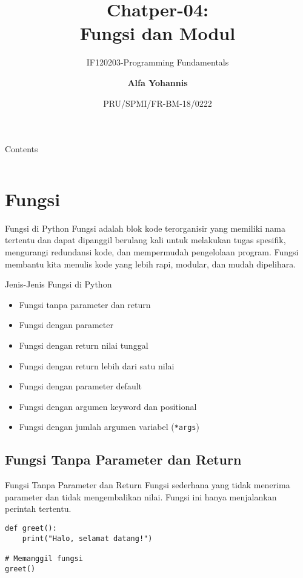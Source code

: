 \documentclass[aspectratio=169, table]{beamer}
\subtitle{IF120203-Programming Fundamentals}
\title{Chatper-04:\\\LARGE{Fungsi dan Modul\\}
\vspace{10pt}}
\date[Serial]{\scriptsize {PRU/SPMI/FR-BM-18/0222}}
\author[Pradita]{\small{\textbf{Alfa Yohannis}}}
\begin{document}
\frame{\titlepage}

\begin{frame}[fragile]{Contents}
\vspace{15pt}
\begin{columns}[t]
\begin{column}{.5\textwidth}
\tableofcontents[sections={1}]
\end{column}
\begin{column}{.5\textwidth}
\tableofcontents[sections={2-3}]
\end{column}
\end{columns}
\end{frame}

\section{Fungsi}

\begin{frame}{Fungsi di Python}
Fungsi adalah blok kode terorganisir yang memiliki nama tertentu dan dapat dipanggil berulang kali untuk melakukan tugas spesifik, mengurangi redundansi kode, dan mempermudah pengelolaan program. Fungsi membantu kita menulis kode yang lebih rapi, modular, dan mudah dipelihara.
\end{frame}

\begin{frame}{Jenis-Jenis Fungsi di Python}
    \begin{itemize}
        \item Fungsi tanpa parameter dan return
        \item Fungsi dengan parameter
        \item Fungsi dengan return nilai tunggal
        \item Fungsi dengan return lebih dari satu nilai
        \item Fungsi dengan parameter default
        \item Fungsi dengan argumen keyword dan positional
        \item Fungsi dengan jumlah argumen variabel (\texttt{*args})
    \end{itemize}
\end{frame}

\subsection{Fungsi Tanpa Parameter dan Return}
\begin{frame}[fragile]{Fungsi Tanpa Parameter dan Return}
Fungsi sederhana yang tidak menerima parameter dan tidak mengembalikan nilai. Fungsi ini hanya menjalankan perintah tertentu.

\begin{lstlisting}[style=PythonStyle, caption={Kode Python: basic_function.py}]
def greet():
    print("Halo, selamat datang!")

# Memanggil fungsi
greet()
\end{lstlisting}
\end{frame}
\end{document}
